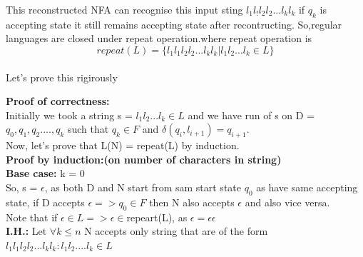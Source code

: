 \documentclass{article}
\begin{document}
This reconstructed NFA can recognise this input sting $l_1l_!l_2l_2...l_kl_k$ if $q_k$ is accepting state it still remains accepting state after recontructing. So,regular languages are closed under repeat operation.where repeat operation is\\
$$repeat(L)=\{l_1l_1l_2l_2...l_kl_k|l_1l_2...l_k \in L \}$$\\

Let's prove this rigirously\\

\pagebreak

\textbf{Proof of correctness:}\\
Initially we took a string s = $l_1l_2...l_k \in L$ and we have run of s on D = $q_0,q_1,q_2....,q_k$
such that $q_k \in F$ and $\delta(q_i,l_{i+1})=q_{i+1}$.\\

Now, let's prove that L(N) = repeat(L) by induction.\\

\textbf{Proof by induction:(on number of characters in string)}\\

\textbf{Base case:} k = 0\\
So, s = $\epsilon $, as both D and N start from sam start state $q_0$ as have same accepting state, if D accepts $\epsilon => q_0 \in F$ then N also accepts $\epsilon$ and also vice versa.\\
Note that if $\epsilon \in L => \epsilon \in $repeart(L), as $\epsilon = \epsilon \epsilon$\\ 

\textbf{I.H.:} Let $\forall k \leq n$ N accepts only string that are of the form $l_1l_1l_2l_2...l_kl_k : l_1l_2....l_k \in L$\\
\end{document}

